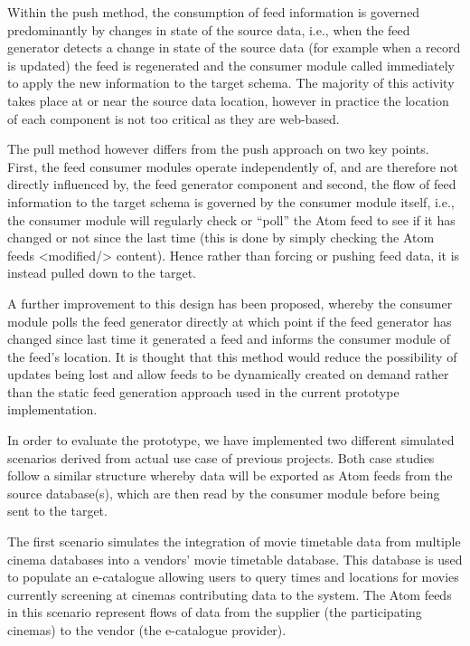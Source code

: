 \documentclass{CRPITStyle}
\begin{document}
Within the push method, the consumption of feed information is governed
predominantly by changes in state of the source data, i.e., when the feed
generator detects a change in state of the source data (for example when
a record is updated) the feed is regenerated and the consumer module
called immediately to apply the new information to the target schema. 
The majority of this activity takes place at or near the source data location,
however in practice the location of each component is not too critical as
they are web-based.

The pull method however differs from the push approach on two
key points. First, the feed consumer modules operate independently of,
and are therefore not directly influenced by, the feed generator
component and second, the flow of feed information to the target schema
is governed by the consumer module itself, i.e., the consumer module
will regularly check or ``poll'' the Atom feed to see if it has changed
or not since the last time (this is done by simply checking the Atom
feeds <modified/> content). Hence rather than forcing or pushing feed
data, it is instead pulled down to the target.

A further improvement to this design has been proposed, whereby the
consumer module polls the feed generator directly at which point if the
feed generator has changed since last time it generated a feed and
informs the consumer module of the feed's location. It is thought that
this method would reduce the possibility of updates being lost and allow
feeds to be dynamically created on demand rather than the static
feed generation approach used in the current prototype implementation.

In order to evaluate the prototype, we have implemented two different
simulated scenarios derived from actual use case of previous projects.
Both case studies follow a similar structure whereby data will be
exported as Atom feeds from the source database(s), which are then read 
by the consumer module before being sent to the target.

The first scenario simulates the integration of movie timetable data
from multiple cinema databases into a vendors' movie timetable database.
This database is used to populate an e-catalogue allowing users to query
times and locations for movies currently screening at cinemas
contributing data to the system. The Atom feeds in this scenario
represent flows of data from the supplier (the participating cinemas) to 
the vendor (the e-catalogue provider).
\end{document}
